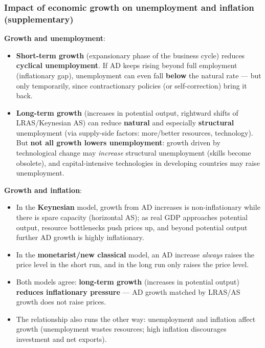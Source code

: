 \subsubsection*{Impact of economic growth on unemployment and inflation (supplementary)}
\textbf{Growth and unemployment}:
\begin{itemize}
  \item \textbf{Short-term growth} (expansionary phase of the business cycle) reduces \textbf{cyclical unemployment}. If AD keeps rising beyond full employment (inflationary gap), unemployment can even fall \textbf{below} the natural rate --- but only temporarily, since contractionary policies (or self-correction) bring it back.
  \item \textbf{Long-term growth} (increases in potential output, rightward shifts of LRAS/Keynesian AS) can reduce \textbf{natural} and especially \textbf{structural} unemployment (via supply-side factors: more/better resources, technology). But \textbf{not all growth lowers unemployment}: growth driven by technological change may \textit{increase} structural unemployment (skills become obsolete), and capital-intensive technologies in developing countries may raise unemployment.
\end{itemize}
\textbf{Growth and inflation}:
\begin{itemize}
  \item In the \textbf{Keynesian} model, growth from AD increases is non-inflationary while there is spare capacity (horizontal AS); as real GDP approaches potential output, resource bottlenecks push prices up, and beyond potential output further AD growth is highly inflationary.
  \item In the \textbf{monetarist/new classical} model, an AD increase \textit{always} raises the price level in the short run, and in the long run only raises the price level.
  \item Both models agree: \textbf{long-term growth} (increases in potential output) \textbf{reduces inflationary pressure} --- AD growth matched by LRAS/AS growth does not raise prices.
  \item The relationship also runs the other way: unemployment and inflation affect growth (unemployment wastes resources; high inflation discourages investment and net exports).
\end{itemize}
